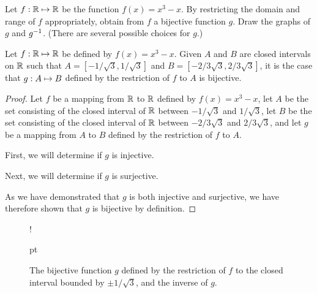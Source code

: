 \documentclass[../main.tex]{subfiles}
\begin{document}
\problem{}\label{s2p6}

Let \({f}: {\mathbb{R}} \mapsto{} {\mathbb{R}}\) be the function \(f(x) = x^3 - x\). By
restricting the domain and range of \(f\) appropriately, obtain from \(f\) a
bijective function \(g\). Draw the graphs of \(g\) and \({g}^{-1}\). (There
are several possible choices for \(g\).)

\begin{thm}
	Let \({f}: {\mathbb{R}} \mapsto{} {\mathbb{R}}\) be defined by \(f(x) = x^3 - x\).
	Given \(A\) and \(B\) are closed intervals on \(\mathbb{R}\) such that
	\(A = [-1/\sqrt{3},1/\sqrt{3}]\) and \(B = [-2/3\sqrt{3},2/3\sqrt{3}]\),
	it is the case that \({g}: {A} \mapsto{} {B}\) defined by the restriction of
	\(f\) to \(A\) is bijective.
\end{thm}
\begin{proof}
	Let \(f\) be a mapping from \(\mathbb{R}\) to \(\mathbb{R}\) defined by
	\(f(x) = x^3 - x\), let \(A\) be the set consisting of the closed
	interval of \(\mathbb{R}\) between \(-1/\sqrt{3}\) and \(1/\sqrt{3}\),
	let \(B\) be the set consisting of the closed interval of \(\mathbb{R}\)
	between \(-2/{3\sqrt{3}}\) and \(2/{3\sqrt{3}}\), and let \(g\) be a
	mapping from \(A\) to \(B\) defined by the restriction of \(f\) to
	\(A\).

	First, we will determine if \(g\) is injective. \todo{}

	Next, we will determine if \(g\) is surjective. \todo{}

	As we have demonstrated that \(g\) is both injective and surjective, we
	have therefore shown that \(g\) is bijective by definition.
\end{proof}

\begin{figure}[H]
\centering{}
\resizebox {\textwidth} {!} {
 pt %
}
\caption{The bijective function \(g\) defined by the restriction of \(f\) to the closed interval bounded by \(\pm 1/\sqrt{3}\), and the inverse of \(g\).}
\end{figure}
\end{document}
